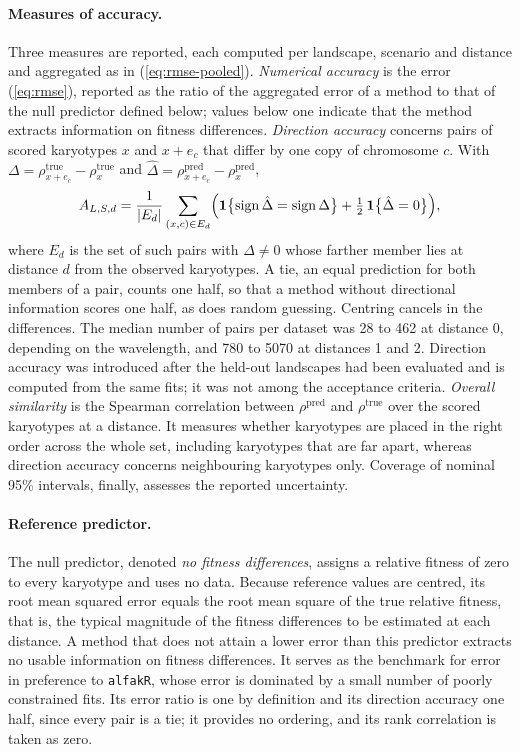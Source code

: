 \documentclass[11pt]{article}
\begin{document}
\paragraph{Measures of accuracy.}
Three measures are reported, each computed per landscape, scenario and
distance and aggregated as in (\ref{eq:rmse-pooled}).
\emph{Numerical accuracy} is the error (\ref{eq:rmse}), reported as the ratio
of the aggregated error of a method to that of the null predictor defined
below; values below one indicate that the method extracts information on
fitness differences. \emph{Direction accuracy} concerns pairs of scored
karyotypes $x$ and $x+e_c$ that differ by one copy of chromosome $c$. With
$\Delta=\rho^{\mathrm{true}}_{x+e_c}-\rho^{\mathrm{true}}_x$ and
$\hat\Delta=\rho^{\mathrm{pred}}_{x+e_c}-\rho^{\mathrm{pred}}_x$,
\begin{equation}
  A_{L,S,d}=\frac{1}{|E_d|}\sum_{(x,c)\in E_d}
  \Bigl(\mathbf{1}\bigl\{\operatorname{sign}\hat\Delta=\operatorname{sign}\Delta\bigr\}
  +\tfrac12\,\mathbf{1}\bigl\{\hat\Delta=0\bigr\}\Bigr),
  \label{eq:direction}
\end{equation}
where $E_d$ is the set of such pairs with $\Delta\neq0$ whose farther member
lies at distance $d$ from the observed karyotypes. A tie, an equal prediction
for both members of a pair, counts one half, so that a method without
directional information scores one half, as does random guessing. Centring
cancels in the differences. The median number of pairs per dataset was 28 to
462 at distance 0, depending on the wavelength, and 780 to 5070 at distances 1
and 2. Direction accuracy was introduced after the held-out landscapes had
been evaluated and is computed from the same fits; it was not among the
acceptance criteria. \emph{Overall similarity} is the Spearman correlation
between $\rho^{\mathrm{pred}}$ and $\rho^{\mathrm{true}}$ over the scored
karyotypes at a distance. It measures whether karyotypes are placed in the
right order across the whole set, including karyotypes that are far apart,
whereas direction accuracy concerns neighbouring karyotypes only. Coverage of
nominal 95\% intervals, finally, assesses the reported uncertainty.

\paragraph{Reference predictor.}
The null predictor, denoted \emph{no fitness differences}, assigns a relative
fitness of zero to every karyotype and uses no data. Because reference values
are centred, its root mean squared error equals the root mean square of the
true relative fitness, that is, the typical magnitude of the fitness
differences to be estimated at each distance. A method that does not attain a
lower error than this predictor extracts no usable information on fitness
differences. It serves as the benchmark for error in preference to
\texttt{alfakR}, whose error is dominated by a small number of poorly
constrained fits. Its error ratio is one by definition and its direction
accuracy one half, since every pair is a tie; it provides no ordering, and its
rank correlation is taken as zero.
\end{document}
